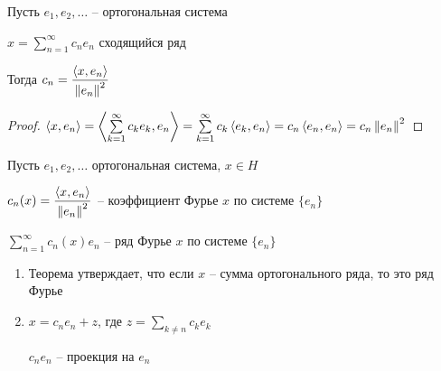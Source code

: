 \begin{theorem}\thmslashn 
	
	Пусть $e_1, e_2, \ldots$ -- ортогональная система
	
	$x = \sum\limits_{n = 1}^{\infty} c_ne_n$ сходящийся ряд
	
	Тогда $c_n = \dfrac{\left\langle x, e_n \right\rangle }{\left\|e_n\right\|^2}$
	
\end{theorem}

\begin{proof}\thmslashn
	
	$\left\langle x, e_n \right\rangle = \left\langle \sum\limits_{k = 1}^\infty c_ke_k, e_n \right\rangle =  \sum\limits_{k = 1}^\infty  c_k \left\langle e_k, e_n \right\rangle = c_n\left\langle e_n, e_n \right\rangle = c_n\left\|e_n\right\|^2$
	
\end{proof}

\begin{definition}\thmslashn
	
	Пусть $e_1, e_2, \ldots$ ортогональная система, $x \in H$
	
	$c_n(x) = \dfrac{\left\langle x, e_n \right\rangle }{\left\|e_n\right\|^2}$ -- коэффициент Фурье $x$ по системе $\{e_n\}$
	
	$\sum\limits_{n = 1}^\infty  c_n(x) e_n$ -- ряд Фурье $x$ по системе $\{e_n\}$
	
\end{definition}

\begin{remarks}\thmslashn
	
	\begin{enumerate}
		\item 
		Теорема утверждает, что если $x$ -- сумма ортогонального ряда, то это ряд Фурье
		
		
		\item 
		$x = c_ne_n + z$, где $z = \sum\limits_{k\not = n} c_ke_k$
		
		$c_ne_n$ -- проекция на $e_n$
		
	\end{enumerate}
	
\end{remarks}

